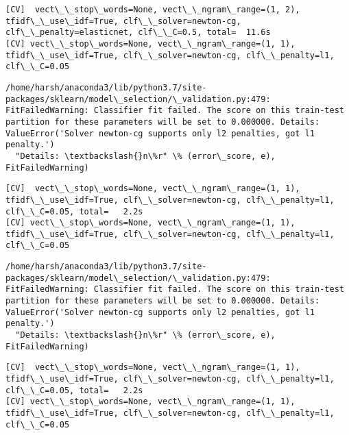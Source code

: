 \documentclass[11pt]{article}
\begin{document}
    \begin{Verbatim}[commandchars=\\\{\}]
[CV]  vect\_\_stop\_words=None, vect\_\_ngram\_range=(1, 2), tfidf\_\_use\_idf=True, clf\_\_solver=newton-cg, clf\_\_penalty=elasticnet, clf\_\_C=0.5, total=  11.6s
[CV] vect\_\_stop\_words=None, vect\_\_ngram\_range=(1, 1), tfidf\_\_use\_idf=True, clf\_\_solver=newton-cg, clf\_\_penalty=l1, clf\_\_C=0.05 

    \end{Verbatim}

    \begin{Verbatim}[commandchars=\\\{\}]
/home/harsh/anaconda3/lib/python3.7/site-packages/sklearn/model\_selection/\_validation.py:479: FitFailedWarning: Classifier fit failed. The score on this train-test partition for these parameters will be set to 0.000000. Details: 
ValueError('Solver newton-cg supports only l2 penalties, got l1 penalty.')
  "Details: \textbackslash{}n\%r" \% (error\_score, e), FitFailedWarning)

    \end{Verbatim}

    \begin{Verbatim}[commandchars=\\\{\}]
[CV]  vect\_\_stop\_words=None, vect\_\_ngram\_range=(1, 1), tfidf\_\_use\_idf=True, clf\_\_solver=newton-cg, clf\_\_penalty=l1, clf\_\_C=0.05, total=   2.2s
[CV] vect\_\_stop\_words=None, vect\_\_ngram\_range=(1, 1), tfidf\_\_use\_idf=True, clf\_\_solver=newton-cg, clf\_\_penalty=l1, clf\_\_C=0.05 

    \end{Verbatim}

    \begin{Verbatim}[commandchars=\\\{\}]
/home/harsh/anaconda3/lib/python3.7/site-packages/sklearn/model\_selection/\_validation.py:479: FitFailedWarning: Classifier fit failed. The score on this train-test partition for these parameters will be set to 0.000000. Details: 
ValueError('Solver newton-cg supports only l2 penalties, got l1 penalty.')
  "Details: \textbackslash{}n\%r" \% (error\_score, e), FitFailedWarning)

    \end{Verbatim}

    \begin{Verbatim}[commandchars=\\\{\}]
[CV]  vect\_\_stop\_words=None, vect\_\_ngram\_range=(1, 1), tfidf\_\_use\_idf=True, clf\_\_solver=newton-cg, clf\_\_penalty=l1, clf\_\_C=0.05, total=   2.2s
[CV] vect\_\_stop\_words=None, vect\_\_ngram\_range=(1, 1), tfidf\_\_use\_idf=True, clf\_\_solver=newton-cg, clf\_\_penalty=l1, clf\_\_C=0.05 

    \end{Verbatim}
\end{document}
